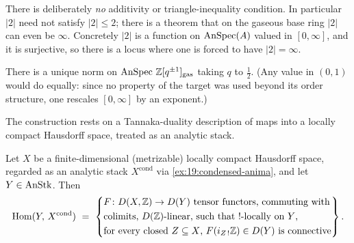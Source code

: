 \begin{remark}
\label{rmk:19:no-triangle}
There is deliberately \emph{no} additivity or triangle-inequality condition. In
particular $|2|$ need not satisfy $|2|\le2$; there is a theorem that on the
gaseous base ring $|2|$ can even be $\infty$. Concretely $|2|$ is a function on
$\operatorname{AnSpec}(A)$ valued in $[0,\infty]$, and it is surjective, so there is a locus
where one is forced to have $|2|=\infty$.
\end{remark}

\begin{theorem}
\label{thm:19:norm-existence}
There is a unique norm on $\operatorname{AnSpec}\,\mathbb Z[q^{\pm1}]_{\mathrm{gas}}$ taking $q$
to $\tfrac12$. (Any value in $(0,1)$ would do equally: since no property of the
target was used beyond its order structure, one rescales $[0,\infty]$ by an
exponent.)
\end{theorem}

The construction rests on a Tannaka-duality description of maps into a locally
compact Hausdorff space, treated as an analytic stack.

\begin{lemma}
\label{lem:19:tanaka}
Let $X$ be a finite-dimensional (metrizable) locally compact Hausdorff space,
regarded as an analytic stack $X^{\mathrm{cond}}$ via \cref{ex:19:condensed-anima},
and let $Y\in\operatorname{AnStk}$. Then
\begin{equation*}
\operatorname{Hom}(Y,\,X^{\mathrm{cond}})\ =\ \left\{
\begin{aligned}
&F\colon D(X,\mathbb Z)\to D(Y)\ \text{tensor functors, commuting with}\\
&\text{colimits, $D(\mathbb Z)$-linear, such that $!$-locally on $Y$,}\\
&\text{for every closed $Z\subseteq X$, } F(i_{Z\,!}\mathbb Z)\in D(Y)
\text{ is connective}
\end{aligned}
\right\}.
\end{equation*}
\end{lemma}

